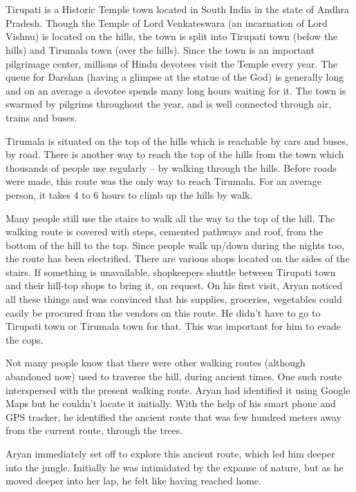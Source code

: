 \chapter{}

Tirupati is a Historic Temple town located in South India in the state of Andhra
Pradesh. Though the Temple of Lord Venkateswara (an incarnation of Lord Vishnu)
is located on the hills, the town is split into Tirupati town (below the hills)
and Tirumala town (over the hills). Since the town is an important pilgrimage
center, millions of Hindu devotees visit the Temple every year. The queue for
Darshan (having a glimpse at the statue of the God) is generally long and on an
average a devotee spends many long hours waiting for it. The town is swarmed by
pilgrims throughout the year, and is well connected through air, trains and
buses.

Tirumala is situated on the top of the hills which is reachable by cars and
buses, by road. There is another way to reach the top of the hills from the town
which thousands of people use regularly – by walking through the hills. Before
roads were made, this route was the only way to reach Tirumala. For an average
person, it takes 4 to 6 hours to climb up the hills by walk.

Many people still use the stairs to walk all the way to the top of the hill. The
walking route is covered with steps, cemented pathways and roof, from the bottom
of the hill to the top. Since people walk up/down during the nights too, the
route has been electrified. There are various shops located on the sides of the
stairs. If something is unavailable, shopkeepers shuttle between Tirupati town
and their hill-top shops to bring it, on request. On his first visit, Aryan
noticed all these things and was convinced that his supplies, groceries,
vegetables could easily be procured from the vendors on this route. He didn't
have to go to Tirupati town or Tirumala town for that. This was important for
him to evade the cops.

Not many people know that there were other walking routes (although abandoned
now) used to traverse the hill, during ancient times. One such route
interspersed with the present walking route. Aryan had identified it using
Google Maps but he couldn't locate it initially. With the help of his smart
phone and GPS tracker, he identified the ancient route that was few hundred
meters away from the current route, through the trees.

Aryan immediately set off to explore this ancient route, which led him deeper
into the jungle. Initially he was intimidated by the expanse of nature, but as
he moved deeper into her lap, he felt like having reached home.

